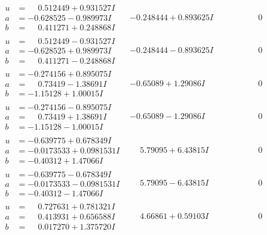 \documentclass[1p]{elsarticle_modified}
\theoremstyle{definition}
\begin{document}
$$\begin{array}{c|c|c}
\begin{aligned}
u &= \phantom{-}0.512449 + 0.931527 I \\
a &= -0.628525 - 0.989973 I \\
b &= \phantom{-}0.411271 + 0.248868 I\end{aligned}
 & -0.248444 + 0.893625 I & \phantom{-0.000000 } 0 \\ \hline\begin{aligned}
u &= \phantom{-}0.512449 - 0.931527 I \\
a &= -0.628525 + 0.989973 I \\
b &= \phantom{-}0.411271 - 0.248868 I\end{aligned}
 & -0.248444 - 0.893625 I & \phantom{-0.000000 } 0 \\ \hline\begin{aligned}
u &= -0.274156 + 0.895075 I \\
a &= \phantom{-}0.73419 - 1.38691 I \\
b &= -1.15128 + 1.00015 I\end{aligned}
 & -0.65089 + 1.29086 I & \phantom{-0.000000 } 0 \\ \hline\begin{aligned}
u &= -0.274156 - 0.895075 I \\
a &= \phantom{-}0.73419 + 1.38691 I \\
b &= -1.15128 - 1.00015 I\end{aligned}
 & -0.65089 - 1.29086 I & \phantom{-0.000000 } 0 \\ \hline\begin{aligned}
u &= -0.639775 + 0.678349 I \\
a &= -0.0173533 + 0.0981531 I \\
b &= -0.40312 + 1.47066 I\end{aligned}
 & \phantom{-}5.79095 + 6.43815 I & \phantom{-0.000000 } 0 \\ \hline\begin{aligned}
u &= -0.639775 - 0.678349 I \\
a &= -0.0173533 - 0.0981531 I \\
b &= -0.40312 - 1.47066 I\end{aligned}
 & \phantom{-}5.79095 - 6.43815 I & \phantom{-0.000000 } 0 \\ \hline\begin{aligned}
u &= \phantom{-}0.727631 + 0.781321 I \\
a &= \phantom{-}0.413931 + 0.656588 I \\
b &= \phantom{-}0.017270 + 1.375720 I\end{aligned}
 & \phantom{-}4.66861 + 0.59103 I & \phantom{-0.000000 } 0 \\ \hline\begin{aligned}

\end{aligned}
\end{array}$$
\end{document}

